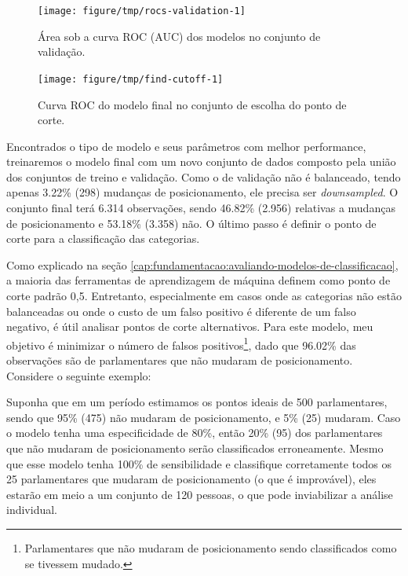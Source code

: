\documentclass[a4paper,titlepage]{ppgi}\usepackage[]{graphicx}\usepackage[]{color}
\newenvironment{knitrout}{}{} %
\begin{document}
\begin{knitrout}
\color{fgcolor}\begin{figure}
\texttt{[image: figure/tmp/rocs-validation-1]} \caption[Área sob a curva ROC (AUC) dos modelos no conjunto de validação]{Área sob a curva ROC (AUC) dos modelos no conjunto de validação.}\label{fig:rocs-validation}
\end{figure}


\end{knitrout}



\begin{knitrout}
\color{fgcolor}\begin{figure}
\texttt{[image: figure/tmp/find-cutoff-1]} \caption[Curva ROC do modelo final no conjunto de escolha do ponto de corte]{Curva ROC do modelo final no conjunto de escolha do ponto de corte.}\label{fig:find-cutoff}
\end{figure}


\end{knitrout}

Encontrados o tipo de modelo e seus parâmetros com melhor performance,
treinaremos o modelo final com um novo conjunto de dados composto pela união
dos conjuntos de treino e validação. Como o de validação não é balanceado,
tendo apenas 3.22\%
(298) mudanças de
posicionamento, ele precisa ser \emph{downsampled}. O conjunto final terá
6.314 observações, sendo
46.82\%
(2.956) relativas a
mudanças de posicionamento e
53.18\%
(3.358) não. O último
passo é definir o ponto de corte para a classificação das categorias.

Como explicado na seção
\ref{cap:fundamentacao:avaliando-modelos-de-classificacao}, a maioria das
ferramentas de aprendizagem de máquina definem como ponto de corte padrão 0,5.
Entretanto, especialmente em casos onde as categorias não estão balanceadas ou
onde o custo de um falso positivo é diferente de um falso negativo, é útil
analisar pontos de corte alternativos. Para este modelo, meu objetivo é
minimizar o número de falsos positivos\footnote{Parlamentares que não mudaram
de posicionamento sendo classificados como se tivessem mudado.}, dado que
96.02\% das observações são de
parlamentares que não mudaram de posicionamento. Considere o seguinte exemplo:

Suponha que em um período estimamos os pontos ideais de 500 parlamentares,
sendo que 95\% (475) não mudaram de posicionamento, e 5\% (25) mudaram. Caso o
modelo tenha uma especificidade de 80\%, então 20\% (95) dos parlamentares que
não mudaram de posicionamento serão classificados erroneamente. Mesmo que esse
modelo tenha 100\% de sensibilidade e classifique corretamente todos os 25
parlamentares que mudaram de posicionamento (o que é improvável), eles estarão
em meio a um conjunto de 120 pessoas, o que pode inviabilizar a análise
individual.
\end{document}
